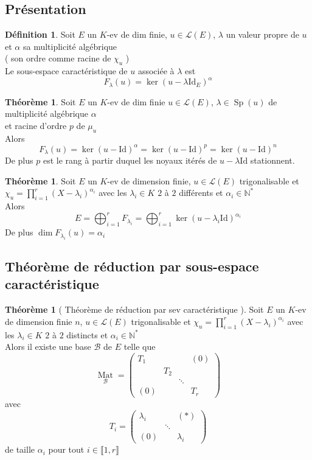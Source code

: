 \documentclass[10pt,a4paper]{article}
\theoremstyle{definition}
\newtheorem{theorem}[proposition]{Théorème}
\newtheorem{definition}[proposition]{Définition}
\DeclareMathOperator{\Sp}{Sp}
\DeclareMathOperator*{\Mat}{Mat}
\begin{document}
\subsection{Présentation}
\begin{definition}
Soit $E$ un $K$-ev de dim finie, $u \in \mathcal{L}(E)$, $\lambda$ un valeur propre de $u$ et $\alpha$ sa multiplicité algébrique \\ ( son ordre comme racine de $\chi_u$ ) \\
Le sous-espace caractéristique de $u$ associée à $\lambda$ est
\[ \boxed{F_\lambda(u) = \ker\left( u - \lambda \text{Id}_E \right)^\alpha} \]
\end{definition}
\begin{theorem}
Soit $E$ un $K$-ev de dim finie $u \in \mathcal{L}(E)$, $\lambda \in \Sp(u)$ de multiplicité algébrique $\alpha$ \\
et racine d'ordre $p$ de $\mu_u$ \\
Alors 
\[ F_\lambda(u) = \ker\left(u - \text{Id}\right)^\alpha = \ker\left(u - \text{Id}\right)^p = \ker\left(u - \text{Id}\right)^n \]
De plus $p$ est le rang à partir duquel les noyaux itérés de $u - \lambda \text{Id}$ stationnent.
\end{theorem}
\begin{theorem}
Soit $E$ un $K$-ev de dimension finie, $u \in \mathcal{L}(E)$ trigonalisable et \\
$\chi_u = \prod\limits_{i = 1}^r (X - \lambda_i)^{\alpha_i}$ avec les $\lambda_i \in K$ $2$ à $2$ différents et $\alpha_i \in \mathbb{N}^*$ \\
Alors
\[ \boxed{E = \bigoplus_{i = 1}^r F_{\lambda_i} = \bigoplus_{i = 1}^r \ker(u - \lambda_i \text{Id})^{\alpha_i}} \]
De plus $\boxed{\dim F_{\lambda_i}(u) = \alpha_i}$
\end{theorem}

\pagebreak

\subsection{Théorème de réduction par sous-espace caractéristique}
\begin{theorem}[ Théorème de réduction par sev caractéristique ]
Soit $E$ un $K$-ev de dimension finie $n$, $u \in \mathcal{L}(E)$ trigonalisable et
$\chi_u = \prod\limits_{i = 1}^r (X - \lambda_i)^{\alpha_i}$ avec les $\lambda_i \in K$ $2$ à $2$ distincts et $\alpha_i \in \mathbb{N}^*$ \\
Alors il existe une base $\mathcal{B}$ de $E$ telle que
\[ \Mat\limits_{\mathcal{B}} = \begin{pmatrix}
\boxed{T_1} & & & (0) \\
& \boxed{T_2} & & \\
& & \ddots & \\
(0) & & & \boxed{T_r}
\end{pmatrix} \]
avec
\[ T_i = \begin{pmatrix}
\lambda_i & & (*) \\
& \ddots & \\
(0) & & \lambda_i
\end{pmatrix} \] de taille $\alpha_i$ pour tout $i \in \llbracket 1, r \rrbracket$
\end{theorem}
\end{document}
